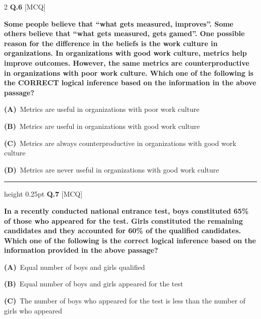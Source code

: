 \documentclass[a4paper,10pt,twoside]{article}
\begin{document}
\begin{multicols}{2}
\noindent\textbf{Q.6} \hfill {\footnotesize\textsf{[MCQ]}}
\par\vspace{2pt}
{\bfseries Some people believe that ``what gets measured, improves''. Some others believe
that ``what gets measured, gets gamed''. One possible reason for the difference in
the beliefs is the work culture in organizations. In organizations with good work
culture, metrics help improve outcomes. However, the same metrics are
counterproductive in organizations with poor work culture.
Which one of the following is the CORRECT logical inference based on the
information in the above passage? \par}
\par\vspace{2pt}\noindent
\textbf{(A)}~Metrics are useful in organizations with poor work culture\par\vspace{2pt}\noindent
\textbf{(B)}~Metrics are useful in organizations with good work culture\par\vspace{2pt}\noindent
\textbf{(C)}~Metrics are always counterproductive in organizations with good work culture\par\vspace{2pt}\noindent
\textbf{(D)}~Metrics are never useful in organizations with good work culture
\par\vspace{6pt}\hrule height 0.25pt\vspace{6pt}
\noindent\textbf{Q.7} \hfill {\footnotesize\textsf{[MCQ]}}
\par\vspace{2pt}
{\bfseries In a recently conducted national entrance test, boys constituted 65\% of those who
appeared for the test. Girls constituted the remaining candidates and they
accounted for 60\% of the qualified candidates.
Which one of the following is the correct logical inference based on the
information provided in the above passage? \par}
\par\vspace{2pt}\noindent
\textbf{(A)}~Equal number of boys and girls qualified\par\vspace{2pt}\noindent
\textbf{(B)}~Equal number of boys and girls appeared for the test\par\vspace{2pt}\noindent
\textbf{(C)}~The number of boys who appeared for the test is less than the number of girls \newline who appeared\par\vspace{2pt}\noindent

\end{multicols}
\end{document}
